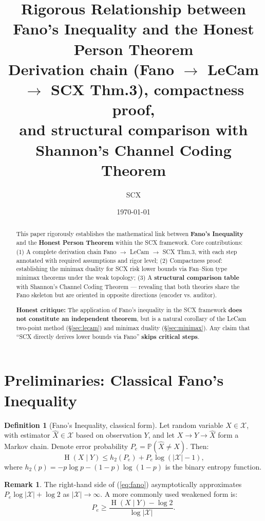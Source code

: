 \documentclass[12pt,a4paper]{article}
\title{\textbf{Rigorous Relationship between Fano's Inequality and the Honest Person Theorem}\\[0.3em]
       \large Derivation chain (Fano $\to$ LeCam $\to$ SCX Thm.3), compactness proof, \\ and structural comparison with Shannon's Channel Coding Theorem}
\author{SCX}
\date{\today}
\theoremstyle{plain}
\theoremstyle{definition}
\newtheorem{definition}[theorem]{Definition}
\newtheorem{remark}[theorem]{Remark}
\DeclareMathOperator{\Ent}{H}
\begin{document}
\maketitle

\begin{abstract}
This paper rigorously establishes the mathematical link between \textbf{Fano's Inequality} and the \textbf{Honest Person Theorem} within the SCX framework. Core contributions:
(1) A complete derivation chain Fano $\to$ LeCam $\to$ SCX Thm.3, with each step annotated with required assumptions and rigor level;
(2) Compactness proof: establishing the minimax duality for SCX risk lower bounds via Fan--Sion type minimax theorems under the weak topology;
(3) A \textbf{structural comparison table} with Shannon's Channel Coding Theorem --- revealing that both theories share the Fano skeleton but are oriented in opposite directions (encoder vs. auditor).

\textbf{Honest critique:} The application of Fano's inequality in the SCX framework \textbf{does not constitute an independent theorem}, but is a natural corollary of the LeCam two-point method (\S\ref{sec:lecam}) and minimax duality (\S\ref{sec:minimax}). Any claim that ``SCX directly derives lower bounds via Fano'' \textbf{skips critical steps}.
\end{abstract}

\tableofcontents

\section{Preliminaries: Classical Fano's Inequality}

\begin{definition}[Fano's Inequality, classical form]
\label{def:fano}
Let random variable $X \in \mathcal{X}$, with estimator $\hat{X} \in \mathcal{X}$ based on observation $Y$, and let $X \to Y \to \hat{X}$ form a Markov chain. Denote error probability $P_e = \mathbb{P}(\hat{X} \neq X)$. Then:
\begin{equation}\label{eq:fano}
\Ent(X \mid Y) \leq h_2(P_e) + P_e \log(|\mathcal{X}| - 1),
\end{equation}
where $h_2(p) = -p\log p - (1-p)\log(1-p)$ is the binary entropy function.
\end{definition}

\begin{remark}
The right-hand side of (\ref{eq:fano}) asymptotically approximates $P_e \log|\mathcal{X}| + \log 2$ as $|\mathcal{X}| \to \infty$.
A more commonly used weakened form is:
\begin{equation}\label{eq:fano_weak}
P_e \geq \frac{\Ent(X \mid Y) - \log 2}{\log|\mathcal{X}|}.
\end{equation}
\end{remark}
\end{document}
